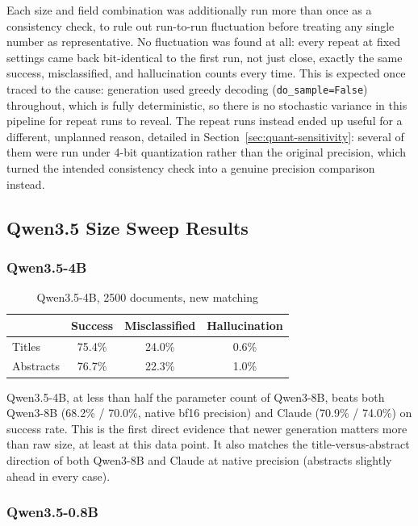 Each size and field combination was additionally run more than once as a consistency check, to rule out run-to-run fluctuation before treating any single number as representative. No fluctuation was found at all: every repeat at fixed settings came back bit-identical to the first run, not just close, exactly the same success, misclassified, and hallucination counts every time. This is expected once traced to the cause: generation used greedy decoding (\texttt{do\_sample=False}) throughout, which is fully deterministic, so there is no stochastic variance in this pipeline for repeat runs to reveal. The repeat runs instead ended up useful for a different, unplanned reason, detailed in Section~\ref{sec:quant-sensitivity}: several of them were run under 4-bit quantization rather than the original precision, which turned the intended consistency check into a genuine precision comparison instead.

\subsection{Qwen3.5 Size Sweep Results}

\subsubsection{Qwen3.5-4B}

\begin{table}[h]
\centering
\caption{Qwen3.5-4B, 2500 documents, new matching}
\label{tab:qwen35-4b}
\begin{tabular}{lccc}
\toprule
 & Success & Misclassified & Hallucination \\
\midrule
Titles & 75.4\% & 24.0\% & 0.6\% \\
Abstracts & 76.7\% & 22.3\% & 1.0\% \\
\bottomrule
\end{tabular}
\end{table}

Qwen3.5-4B, at less than half the parameter count of Qwen3-8B, beats both Qwen3-8B (68.2\% / 70.0\%, native bf16 precision) and Claude (70.9\% / 74.0\%) on success rate. This is the first direct evidence that newer generation matters more than raw size, at least at this data point. It also matches the title-versus-abstract direction of both Qwen3-8B and Claude at native precision (abstracts slightly ahead in every case).

\subsubsection{Qwen3.5-0.8B}

